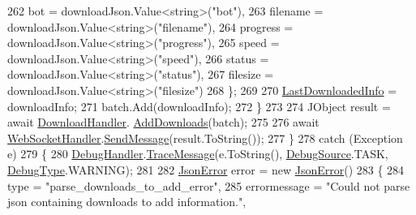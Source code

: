 \begin{DoxyCode}
262                         bot = downloadJson.Value<\textcolor{keywordtype}{string}>(\textcolor{stringliteral}{"bot"}),
263                         filename = downloadJson.Value<\textcolor{keywordtype}{string}>(\textcolor{stringliteral}{"filename"}),
264                         progress = downloadJson.Value<\textcolor{keywordtype}{string}>(\textcolor{stringliteral}{"progress"}),
265                         speed = downloadJson.Value<\textcolor{keywordtype}{string}>(\textcolor{stringliteral}{"speed"}),
266                         status = downloadJson.Value<\textcolor{keywordtype}{string}>(\textcolor{stringliteral}{"status"}),
267                         filesize = downloadJson.Value<\textcolor{keywordtype}{string}>(\textcolor{stringliteral}{"filesize"})
268                     \};
269 
270                     \mbox{\hyperlink{class_little_weeb_library_1_1_services_1_1_download_web_socket_service_a541fd25204120f3ee2b7f70deae533ce}{LastDownloadedInfo}} = downloadInfo;
271                     batch.Add(downloadInfo);
272                 \}
273                 
274                 JObject result = await \mbox{\hyperlink{class_little_weeb_library_1_1_handlers_1_1_download_handler}{DownloadHandler}}.
      \mbox{\hyperlink{class_little_weeb_library_1_1_handlers_1_1_download_handler_ac03f2dc024c0884bb7bd1c68ee03142e}{AddDownloads}}(batch);
275 
276                 await \mbox{\hyperlink{class_little_weeb_library_1_1_handlers_1_1_web_socket_handler}{WebSocketHandler}}.\mbox{\hyperlink{class_little_weeb_library_1_1_handlers_1_1_web_socket_handler_a1de289d54d665a32c93478c68d3e6ad0}{SendMessage}}(result.ToString());
277             \}
278             \textcolor{keywordflow}{catch} (Exception e)
279             \{
280                 \mbox{\hyperlink{class_little_weeb_library_1_1_handlers_1_1_debug_handler}{DebugHandler}}.\mbox{\hyperlink{class_little_weeb_library_1_1_handlers_1_1_debug_handler_afccb37dfd6b2114af72000c2f4fe4607}{TraceMessage}}(e.ToString(), 
      \mbox{\hyperlink{namespace_little_weeb_library_1_1_handlers_a2a6ca0775121c9c503d58aa254d292be}{DebugSource}}.TASK, \mbox{\hyperlink{namespace_little_weeb_library_1_1_handlers_ab66019ed40462876ec4e61bb3ccb0a62}{DebugType}}.WARNING);
281 
282                 \mbox{\hyperlink{class_little_weeb_library_1_1_models_1_1_json_error}{JsonError}} error = \textcolor{keyword}{new} \mbox{\hyperlink{class_little_weeb_library_1_1_models_1_1_json_error}{JsonError}}()
283                 \{
284                     type = \textcolor{stringliteral}{"parse\_downloads\_to\_add\_error"},
285                     errormessage = \textcolor{stringliteral}{"Could not parse json containing downloads to add information."},

\end{DoxyCode}
